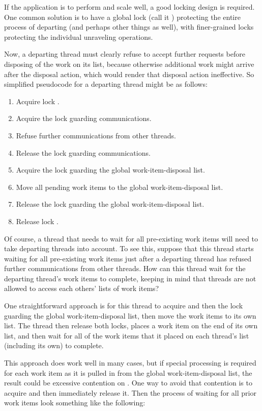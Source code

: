 {	If the application is to perform and scale well, a good locking
	design is required.
	One common solution is to have a global lock (call it )
	protecting the entire
	process of departing (and perhaps other things as well),
	with finer-grained locks protecting the
	individual unraveling operations.

	Now, a departing thread must clearly refuse to accept further
	requests before disposing of the work on its list, because
	otherwise additional work might arrive after the disposal action,
	which would render that disposal action ineffective.
	So simplified pseudocode for a departing thread might be as follows:

	\begin{enumerate}
	\item	Acquire lock .
	\item	Acquire the lock guarding communications.
	\item	Refuse further communications from other threads.
	\item	Release the lock guarding communications.
	\item	Acquire the lock guarding the global work-item-disposal list.
	\item	Move all pending work items to the global
		work-item-disposal list.
	\item	Release the lock guarding the global work-item-disposal list.
	\item	Release lock .
	\end{enumerate}

	Of course, a thread that needs to wait for all pre-existing work
	items will need to take departing threads into account.
	To see this, suppose that this thread starts waiting for all
	pre-existing work items just after a departing thread has refused
	further communications from other threads.
	How can this thread wait for the departing thread's work items
	to complete, keeping in mind that threads are not allowed to
	access each others' lists of work items?

	One straightforward approach is for this thread to acquire 
	and then the lock guarding the global work-item-disposal list, then
	move the work items to its own list.
	The thread then release both locks,
	places a work item on the end of its own list,
	and then wait for all of the work items that it placed on each thread's
	list (including its own) to complete.

	This approach does work well in many cases, but if special
	processing is required for each work item as it is pulled in
	from the global work-item-disposal list, the result could be
	excessive contention on .
	One way to avoid that contention is to acquire  and then
	immediately release it.
	Then the process of waiting for all prior work items look
	something like the following:

}
